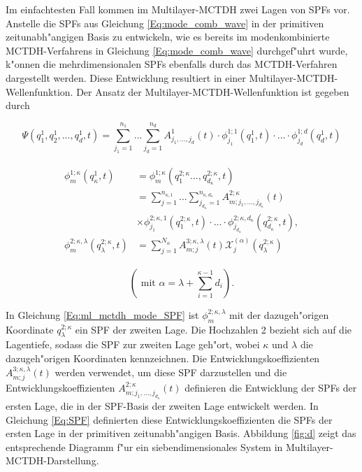 Im einfachtesten Fall kommen im Multilayer-MCTDH zwei Lagen von SPFs vor.
Anstelle die SPFs aus Gleichung \ref{Eq:mode_comb_wave} in der primitiven zeitunabh"angigen Basis zu entwickeln, wie es bereits
im modenkombinierte MCTDH-Verfahrens in Gleichung \ref{Eq:mode_comb_wave} durchgef"uhrt wurde,
k"onnen die mehrdimensionalen SPFs ebenfalls durch das MCTDH-Verfahren dargestellt werden.
Diese Entwicklung resultiert in einer Multilayer-MCTDH-Wellenfunktion. 
Der Ansatz der Multilayer-MCTDH-Wellenfunktion ist gegeben durch 

\begin{equation}
  \Psi(q^{1}_{1},q^{1}_{2},..., q^{1}_{d}, t)=\sum^{n_{1}}_{j_{1}=1} ... \sum^{n_{d}}_{j_{d}=1} A^{1}_{j_{1}, ..., j_{d}}(t)
  \cdot \phi^{1;1}_{j_{1}}(q^1_{1}, t) \cdot ... \cdot \phi^{1;d}_{j_{d}}(q^1_{d}, t)
  \label{Eq:ml_mctdh_wave}
  \end{equation}

\begin{align}
  \begin{split}
 \phi^{1;\kappa}_{m} (q^1_{\kappa}, t) & =  \phi^{1;\kappa}_{m} (q^{2;\kappa}_1..., q^{2;\kappa}_{d_{\kappa}},t)\\
 & = \sum^{n_{\kappa,1}}_{j=1} ... \sum^{n_{\kappa,d_\kappa}}_{j_{d_\kappa}=1} A^{2;\kappa}_{m;j_1,...,j_{d_\kappa}}(t) \\
 & \times \phi^{2;\kappa,1}_{j_1} (q^{2;\kappa}_{1}, t) \cdot ... \cdot
 \phi^{2;\kappa,d_\kappa}_{j_{d_\kappa}} (q^{2;\kappa}_{d_\kappa}, t),
\\
 \phi^{2;\kappa, \lambda}_{m} (q^{2;\kappa}_{\lambda}, t)&= \sum^{N_{\alpha}}_{j=1} A^{3;\kappa, \lambda}_{m;j}(t)
 \mathcal{X}^{(\alpha)}_{j}(q^{2;\kappa}_\lambda)
 \label{Eq:ml_mctdh_mode_SPF}
  \end{split}
 \end{align}

 \begin{equation}
  \left( \text{ mit } \alpha = \lambda + \sum^{\kappa - 1}_{i=1}d_i \right).
 \end{equation}

In Gleichung \ref{Eq:ml_mctdh_mode_SPF} ist $ \phi^{2;\kappa, \lambda}_{m}  $ 
mit der dazugeh"origen Koordinate $q^{2;\kappa}_\lambda$ ein SPF der zweiten Lage.
Die Hochzahlen 2 bezieht sich auf die Lagentiefe, sodass die SPF zur zweiten Lage geh"ort, 
wobei $\kappa$ und $\lambda$ die dazugeh"origen Koordinaten kennzeichnen.
Die Ent\-wicklungskoeffizienten $A^{3;\kappa, \lambda}_{m;j}(t) $ werden verwendet, um diese SPF darzustellen
und die Entwicklungskoeffizienten $A^{2;\kappa}_{m;j_1,...,j_{d_\kappa}}(t)$ definieren die Entwicklung der SPFs der ersten Lage, die
in der SPF-Basis der zweiten Lage entwickelt werden.
In Gleichung \ref{Eq:SPF} definierten diese Entwicklungskoeffizienten die SPFs der ersten Lage in der primitiven zeitunabh"angigen Basis.
Abbildung \ref{fig:d} zeigt das entsprechende Diagramm f"ur ein siebendimensionales System in Multilayer-MCTDH-Darstellung.

